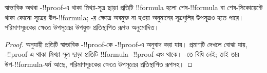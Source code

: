 \documentclass[../../../include/open-logic-section]{subfiles}
\begin{document}
\begin{cor}
স্বাভাবিক  অথবা
-!!{proof}-এ থাকা
মিথ্যা-সূত্র ছাড়া প্রতিটি !!{formula} হলো
শেষ-!!{formula} বা
শেষ-সিকোয়েন্টে থাকা কোনো
সূত্রের উপ-!!{formula};
-র ক্ষেত্রে
অবমুক্ত না হওয়া অনুমানের
সূত্রগুলির উপসূত্রও হতে পারে। পরিমাণসূচকের ক্ষেত্রে
উপসূত্রের উপযুক্ত প্রতিস্থাপিত রূপও অনুমোদিত।
\end{cor}

\begin{proof}
  অনুযায়ী প্রতিটি স্বাভাবিক
  -!!{proof}-কে
  -!!{proof}-এ
  অনুবাদ করা যায়। প্রমাণটি
  দেখলে বোঝা যায়,
  -!!{proof}-এ থাকা
  মিথ্যা-সূত্র ছাড়া প্রতিটি !!{formula}
  -!!{proof}-এও
  থাকে। -তে
  \Cut{} বিধি নেই; তাই
  তার উপ-!!{formula}-ধর্ম আছে, পরিমাণসূচকের
  ক্ষেত্রে উপসূত্রের প্রতিস্থাপিত রূপসহ।
\end{proof}
\end{document}
